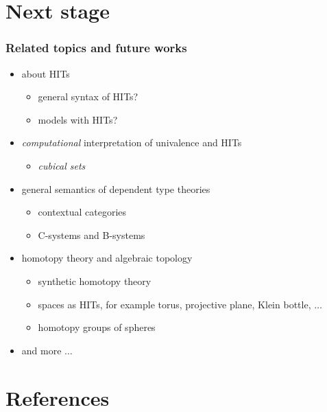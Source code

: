 \documentclass[dvipdfmx]{beamer}
\begin{document}
\section{Next stage}

\begin{frame}
  \frametitle{Related topics and future works}
  \begin{itemize}
    \item about HITs
      \begin{itemize}
        \item general syntax of HITs?
        \item models with HITs?
      \end{itemize}
    \item {\it computational} interpretation of
      univalence and HITs
      \begin{itemize}
        \item {\it cubical sets}
          \cite{bezem_et_al:LIPIcs:2014:4628}
      \end{itemize}
    \item general semantics of dependent type theories
      \begin{itemize}
        \item contextual categories
          \cite{Cartmell1986209}
        \item C-systems and B-systems
          \cite{voevodsky2014subsystems,voevodsky2014bsystems}
      \end{itemize}
    \item homotopy theory and algebraic topology
      \begin{itemize}
        \item synthetic homotopy theory
        \item spaces as HITs, for example
          torus, projective plane, Klein bottle, $\dots$
        \item homotopy groups of spheres
      \end{itemize}
    \item and more $\dots$
  \end{itemize}
\end{frame}

%

\section{References}



\end{document}
